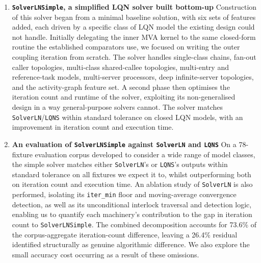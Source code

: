 \begin{enumerate}
\item \textbf{\texttt{SolverLNSimple}, a simplified LQN solver built bottom-up} Construction of this solver began from a minimal baseline solution, with six sets of features added, each driven by a specific class of LQN model the existing design could not handle. Initially delegating the inner MVA kernel to the same closed-form routine the established comparators use, we focused on writing the outer coupling iteration from scratch. The solver handles single-class chains, fan-out caller topologies, multi-class shared-callee topologies, multi-entry and reference-task models, multi-server processors, deep infinite-server topologies, and the activity-graph feature set. A second phase then optimises the iteration count and runtime of the solver, exploiting its non-generalised design in a way general-purpose solvers cannot.
The solver matches \texttt{SolverLN}/\texttt{LQNS} within standard tolerance on closed LQN models, with an improvement in iteration count and execution time.


\item \textbf{An evaluation of \texttt{SolverLNSimple} against \texttt{SolverLN} and \texttt{LQNS}} On a 78-fixture evaluation corpus developed to consider a wide range of model classes, the simple solver matches either \texttt{SolverLN}'s or \texttt{LQNS}'s outputs within standard tolerance on all fixtures we expect it to, whilst outperforming both on iteration count and execution time.
An ablation study of \texttt{SolverLN} is also performed, isolating its \texttt{iter\_min} floor and moving-average convergence detection, as well as its unconditional interlock traversal and detection logic, enabling us to quantify each machinery's contribution to the gap in iteration count to \texttt{SolverLNSimple}. The combined decomposition accounts for 73.6\% of the corpus-aggregate iteration-count difference, leaving a 26.4\% residual identified structurally as genuine algorithmic difference. We also explore the small accuracy cost occurring as a result of these omissions.
\end{enumerate}